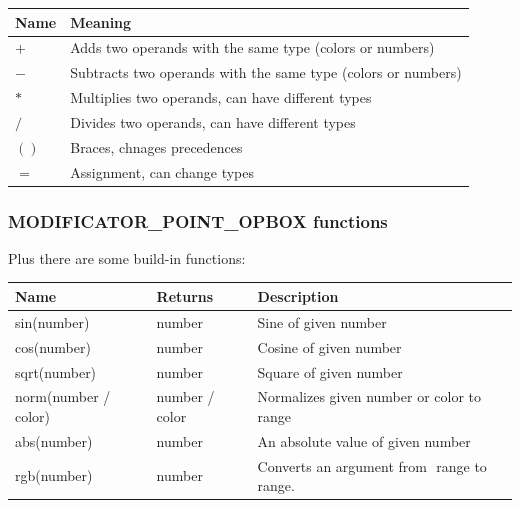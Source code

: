 \documentclass[9pt]{article}
\begin{document}
\begin{center}
\begin{tabular}{|l||l|}
\hline
Name & Meaning \\
\hline
\hline
\begin{math}+\end{math} & Adds two operands with the same type (colors or numbers) \\
\begin{math}-\end{math} & Subtracts two operands with the same type (colors or numbers) \\
\begin{math}*\end{math} & Multiplies two operands, can have different types \\
\begin{math}/\end{math} & Divides two operands, can have different types \\
\begin{math}()\end{math} & Braces, chnages precedences \\
\begin{math}=\end{math} & Assignment, can change types  \\
\hline
\end{tabular}
\end{center}

\subsubsection*{MODIFICATOR\_POINT\_OPBOX functions}

Plus there are some build-in functions:

\begin{center}
\begin{tabular}{|l||l||l|}
\hline
Name & Returns & Description \\
\hline
\hline
sin(number) & number & Sine of given number  \\ 
cos(number) & number & Cosine of given number \\ 
sqrt(number) & number & Square of given number \\ 
norm(number / color) & number / color & Normalizes given number or color to \begin{math}<0,1>\end{math}range \\ 
abs(number) & number & An absolute value of given number \\ 
rgb(number) & number & Converts an argument from \begin{math}<0,255>\end{math} range to \begin{math}<0,1>\end{math} range. \\
\hline
\end{tabular}
\end{center}
\end{document}

